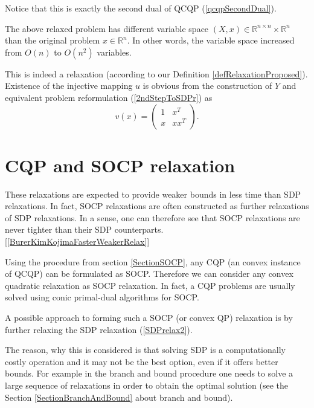 \documentclass[12pt]{book}
\theoremstyle{definition}
\begin{document}
\rem Notice that this is exactly the second dual of QCQP (\ref{qcqpSecondDual}).




The above relaxed problem has different variable space $(X,x)\in \mathbb{R}^{n\times n}\times \mathbb{R}^n$ than the original problem $x\in \mathbb{R}^n$. 
In other words, the variable space increased from $O(n)$ to $O(n^2)$ variables.

\rem This is indeed a relaxation (according to our Definition \ref{defRelaxationProposed}). Existence of the injective mapping $u$ is obvious from the construction of $Y$ and equivalent problem reformulation (\ref{2ndStepToSDPr}) as 
$$v(x)=\left(
\begin{array}{cc}
1 & x^T\\
x & xx^T
\end{array}\right).
$$

\section{CQP and SOCP relaxation}
\label{SectionSOCPrelaxation}

These relaxations are expected to provide weaker bounds in less time than SDP relaxations. In fact, SOCP relaxations are often constructed as further relaxations of SDP relaxations. In a sense, one can therefore see that SOCP relaxations are never tighter than their SDP counterparts. [\ref{BurerKimKojimaFasterWeakerRelax}]

Using the procedure from section \ref{SectionSOCP}, any CQP (an convex instance of QCQP) can be formulated as SOCP. Therefore we can consider any convex quadratic relaxation as SOCP relaxation. In fact, a CQP problems are usually solved using conic primal-dual algorithms for SOCP.


A possible approach to forming such a SOCP (or convex QP) relaxation is by further relaxing the SDP relaxation (\ref{SDPrelax2}).

The reason, why this is considered is that solving SDP is a computationally costly operation and it may not be the best option, even if it offers better bounds. For example in the branch and bound procedure one needs to solve a large sequence of relaxations in order to obtain the optimal solution (see the Section \ref{SectionBranchAndBound} about branch and bound).
\end{document}
